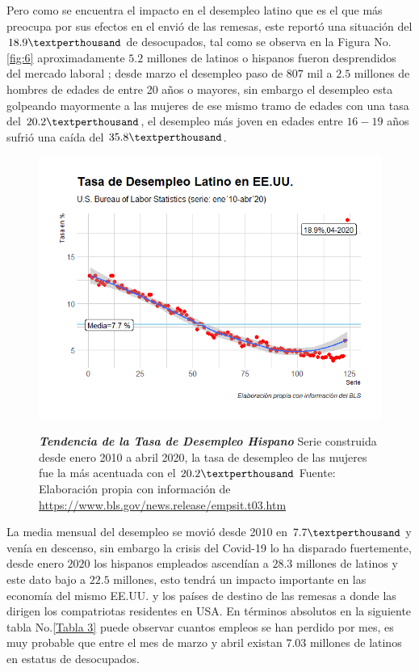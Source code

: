 Pero como se encuentra el impacto en el desempleo latino que es el que más preocupa por sus efectos en el envió de las remesas, este reportó una situación del $18.9 \textperthousand$ de desocupados, tal como se observa en la Figura No.\eqref{fig:6} aproximadamente $5.2$ millones de latinos o hispanos fueron desprendidos del mercado laboral ; desde marzo el desempleo paso de $807$ mil a $2.5$ millones de hombres de edades de entre 20 años o mayores, sin embargo el desempleo esta golpeando mayormente a las mujeres de ese mismo tramo de edades con una tasa del $20.2 \textperthousand$, el desempleo más joven en edades entre $16-19$ años sufrió una caída del $35.8 \textperthousand$.

\begin{figure}[H]
	\centering
	\resizebox{16.5 cm}{!} { 
		\includegraphics[width=1\linewidth]{Imagenes/TasaDeLa}}
	\caption{\textbf{\textit{Tendencia de la Tasa de Desempleo Hispano}}
		{\small Serie construida desde enero 2010 a abril 2020, la tasa de desempleo de las mujeres fue la más acentuada con el $20.2 \textperthousand$ Fuente: Elaboración propia con información de \href{https://www.bls.gov/news.release/empsit.t03.htm}{https://www.bls.gov/news.release/empsit.t03.htm}}
	} 
	\label{fig:6}
	
\end{figure}

La media mensual del desempleo se movió desde 2010 en $7.7\textperthousand$ y venía en descenso,  sin embargo la crisis del Covid-19 lo ha disparado fuertemente, desde enero $2020$ los hispanos empleados ascendían a $28.3$ millones de latinos y este dato bajo a $22.5$ millones, esto tendrá un impacto importante en las economía del mismo EE.UU. y los países de destino de las remesas a donde las dirigen los compatriotas residentes en USA. En términos absolutos en la siguiente tabla No.\eqref{Tabla 3} puede observar cuantos empleos se han perdido por mes, es muy probable que entre el mes de marzo y abril existan $7.03$ millones de latinos en estatus de desocupados.


